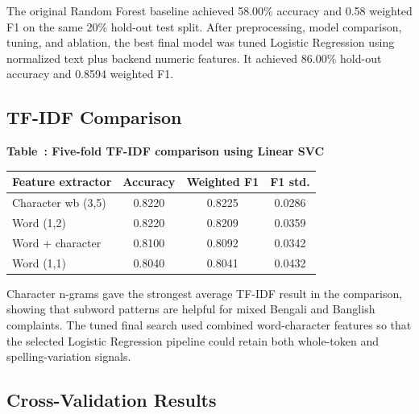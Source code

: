 \documentclass[a4paper,fleqn]{cas-dc}
\newcommand{\fixedtablecaption}[2]{%
  \refstepcounter{table}\label{#1}%
  \smallskip\noindent\small\textbf{Table~\thetable: #2}\par\smallskip}
\begin{document}
The original Random Forest baseline achieved 58.00\% accuracy and 0.58 weighted F1 on the same 20\% hold-out test split. After preprocessing, model comparison, tuning, and ablation, the best final model was tuned Logistic Regression using normalized text plus backend numeric features. It achieved 86.00\% hold-out accuracy and 0.8594 weighted F1.

\subsection{TF-IDF Comparison}

\begin{center}
\fixedtablecaption{tab:tfidf_comparison}{Five-fold TF-IDF comparison using Linear SVC}
\centering
\small
\renewcommand{\arraystretch}{1.12}
\begin{tabular}{|l|c|c|c|}
\hline
Feature extractor & Accuracy & Weighted F1 & F1 std. \\
\hline
Character wb (3,5) & 0.8220 & 0.8225 & 0.0286 \\
Word (1,2) & 0.8220 & 0.8209 & 0.0359 \\
Word + character & 0.8100 & 0.8092 & 0.0342 \\
Word (1,1) & 0.8040 & 0.8041 & 0.0432 \\
\hline
\end{tabular}
\end{center}

Character n-grams gave the strongest average TF-IDF result in the comparison, showing that subword patterns are helpful for mixed Bengali and Banglish complaints. The tuned final search used combined word-character features so that the selected Logistic Regression pipeline could retain both whole-token and spelling-variation signals.
\FloatBarrier

\subsection{Cross-Validation Results}
\end{document}
